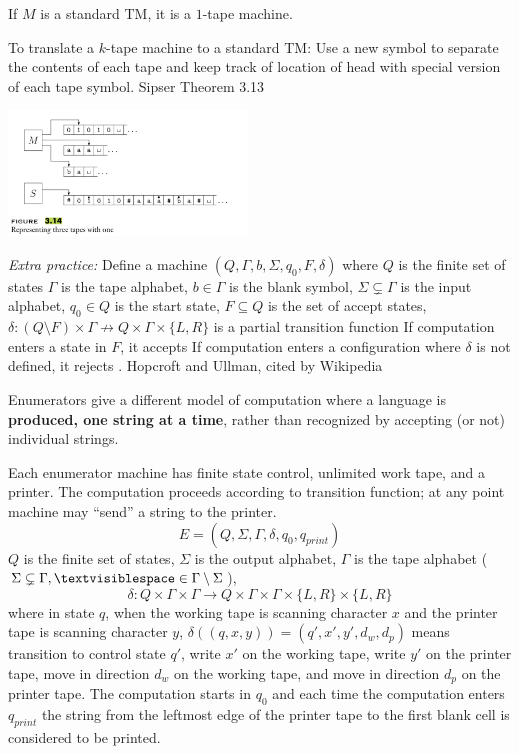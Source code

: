 \documentclass[12pt, oneside]{article}
\begin{document}
If $M$ is a standard  TM, it is a $1$-tape machine.


To translate a $k$-tape machine  to  a standard TM:
Use a  new symbol to separate the contents of each tape
and keep track of location of  head with  special version of each
tape symbol. {\tiny Sipser Theorem 3.13} 

\includegraphics[width=2.5in]{resources/images/Figure314.png}

\vfill

{\it Extra practice:} 
Define a machine $(Q, \Gamma, b, \Sigma,  q_0, F, \delta)$
where $Q$ is the finite set  of  states
$\Gamma$  is the tape alphabet,
$b \in \Gamma$ is the blank symbol, 
$\Sigma \subsetneq \Gamma$ is the  input alphabet, 
$q_0 \in  Q$ is the start state, 
$F \subseteq Q$ is the set of accept states, 
$\delta: (Q \setminus F)  \times  \Gamma \not\to Q \times  \Gamma  \times \{L, R\}$
 is a partial transition function
If computation enters a state  in $F$, it  accepts 
If computation enters a configuration where
 $\delta$ is not defined, it  rejects . {\tiny Hopcroft and  Ullman, cited by  Wikipedia} 

\vfill

\newpage
{} Enumerators give a different
model of computation where a language is {\bf produced, one string at a time},
rather than recognized by accepting (or not) individual strings.

Each enumerator machine has finite state control, unlimited work tape, and a printer. The computation proceeds
according to transition function; at any point machine may ``send'' a string to the printer.
\[
E  = (Q, \Sigma, \Gamma, \delta, q_0, q_{print})  
\]
$Q$ is the finite set of states, $\Sigma$ is  the output alphabet, $\Gamma$ is the 
tape alphabet ($\Sigma  \subsetneq\Gamma, 
\textvisiblespace \in \Gamma \setminus \Sigma$), 
\[
\delta:  Q  \times  \Gamma \times \Gamma \to  Q \times  \Gamma \times  \Gamma \times \{L, R\} \times  \{L, R\}
\]
where in state $q$, when the working tape is scanning character $x$ and the printer tape is scanning character $y$,
$\delta( (q,x,y) ) = (q', x', y', d_w, d_p)$ means transition to control state $q'$, write $x'$ on 
the working tape, write $y'$ on the printer tape, move in direction $d_w$ on the working tape, and move in direction 
$d_p$ on the printer tape. The computation starts in $q_0$ and each time the computation enters $q_{print}$
the string from the leftmost edge of the printer tape to the first blank cell is considered to be printed.
\end{document}
